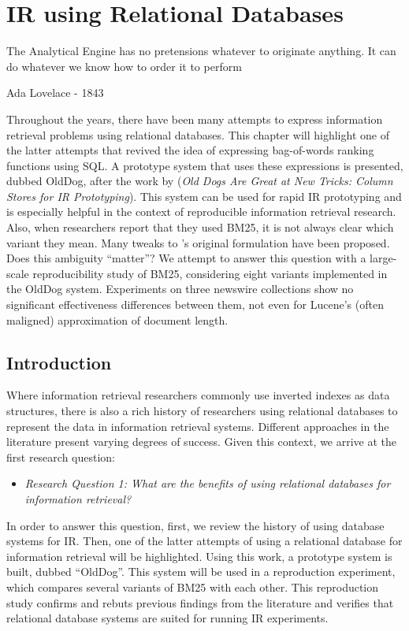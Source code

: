 \chapter{IR using Relational Databases}
\label{ir-using-relational-databases}
\epigraph{The Analytical Engine has no pretensions whatever to originate anything. It can do whatever we know how to order it to perform}{Ada Lovelace - 1843}

\begin{Abstract}
	\begin{changemargin}{1cm}{1cm}
		Throughout the years, there have been many attempts to express information retrieval problems using relational databases. This chapter will highlight one of the latter attempts that revived the idea of expressing bag-of-words ranking functions using SQL. A prototype system that uses these expressions is presented, dubbed OldDog, after the work by \citeauthor{OldDog} (\emph{Old Dogs Are Great at New Tricks: Column Stores for IR Prototyping}). This system can be used for rapid IR prototyping and is especially helpful in the context of reproducible information retrieval research. Also, when researchers report that they used BM25, it is not always clear which variant they mean. Many tweaks to \citeauthor{bm25-robertson}'s original formulation have been proposed. Does this ambiguity ``matter''? We attempt to answer this question with a large-scale reproducibility study of BM25, considering eight variants implemented in the OldDog system. Experiments on three newswire collections show no significant effectiveness differences between them, not even for Lucene's (often maligned) approximation of document length.
	\end{changemargin}
\end{Abstract}

\section{Introduction}
Where information retrieval researchers commonly use inverted indexes as data structures, there is also a rich history of researchers using relational databases to represent the data in information retrieval systems. Different approaches in the literature present varying degrees of success. Given this context, we arrive at the first research question: 
\begin{itemize}  
	\item \emph{Research Question 1: What are the benefits of using relational databases for information retrieval?} 
\end{itemize}
In order to answer this question, first, we review the history of using database systems for IR. Then, one of the latter attempts of using a relational database for information retrieval will be highlighted. Using this work, a prototype system is built, dubbed ``OldDog''. This system will be used in a reproduction experiment, which compares several variants of BM25 with each other. This reproduction study confirms and rebuts previous findings from the literature and verifies that relational database systems are suited for running IR experiments. 

